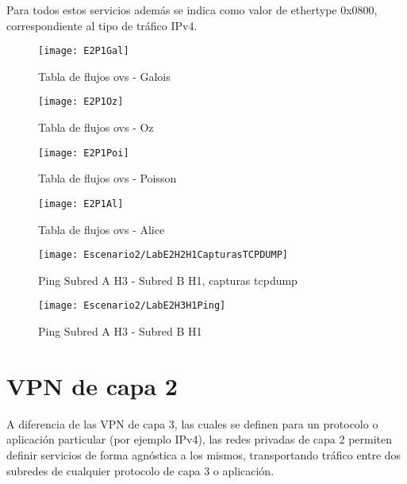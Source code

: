 Para todos estos servicios adem\'as se indica como valor de ethertype 0x0800, correspondiente al tipo de tr\'afico IPv4.

\newpage
\begin{figure}[ht!] 
\centering    
\texttt{[image: E2P1Gal]}
\caption[Tabla de flujos ovs - Galois]{Tabla de flujos ovs - Galois}
\label{fig:CU1P1DumpFlows1}
\end{figure}

\begin{figure}[h!] 
\centering    
\texttt{[image: E2P1Oz]}
\caption[Tabla de flujos ovs - Oz]{Tabla de flujos ovs - Oz}
\label{fig:CU1P1DumpFlows2}
\end{figure}

\begin{figure}[h!] 
\centering    
\texttt{[image: E2P1Poi]}
\caption[Tabla de flujos ovs - Poisson]{Tabla de flujos ovs - Poisson}
\label{fig:CU1P1DumpFlows3}
\end{figure}

\begin{figure}[h!] 
\centering    
\texttt{[image: E2P1Al]}
\caption[Tabla de flujos ovs - Alice]{Tabla de flujos ovs - Alice}
\label{fig:CU1P1DumpFlows4}
\end{figure}

\begin{figure}[h!] 
\centering    
\texttt{[image: Escenario2/LabE2H2H1CapturasTCPDUMP]}
\caption[Ping Subred A H3 - Subred B H1, capturas tcpdump]{Ping Subred A H3 - Subred B H1, capturas tcpdump}
\label{fig:CU1P1DumpFlows5}
\end{figure}

\newpage
\begin{figure}[ht!] 
\centering    
\texttt{[image: Escenario2/LabE2H3H1Ping]}
\caption[Ping Subred A H3 - Subred B H1]{Ping Subred A H3 - Subred B H1}
\label{fig:CU1P1DumpFlows6}
\end{figure}


\newpage
\section{VPN de capa 2}

A diferencia de las VPN de capa 3, las cuales se definen para un protocolo o aplicaci\'on particular (por ejemplo IPv4), las redes privadas de capa 2 permiten definir servicios de forma agnóstica a los mismos, transportando tr\'afico entre dos subredes de cualquier protocolo de capa 3 o aplicación.

